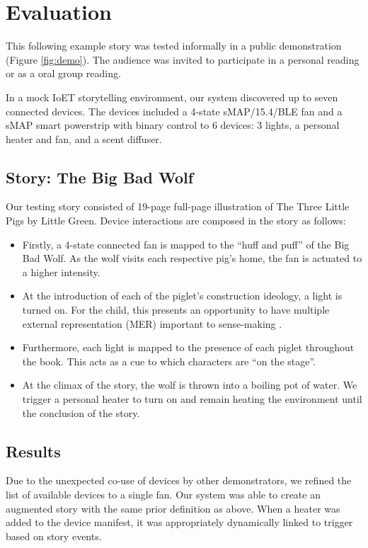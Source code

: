 \documentclass{sigchi}
\begin{document}
\section{Evaluation}
This following example story was tested informally in a public demonstration (Figure \ref{fig:demo}). The audience was invited to participate in a personal reading or as a oral group reading.

In a mock IoET storytelling environment, our system discovered up to seven connected devices. The devices included a 4-state sMAP/15.4/BLE fan and a sMAP smart powerstrip with binary control to 6 devices: 3 lights, a personal heater and fan, and a scent diffuser.  

\subsection{Story: The Big Bad Wolf}
Our testing story consisted of 19-page full-page illustration of The Three Little Pigs by Little Green. Device interactions are composed in the story as follows:
\begin{itemize}
\item Firstly, a 4-state connected fan is mapped to the ``huff and puff'' of the Big Bad Wolf. As the wolf visits each respective pig's home, the fan is actuated to a higher intensity. 
\item At the introduction of each of the piglet's construction ideology, a light is turned on. For the child, this presents an opportunity to have multiple external representation (MER) important to sense-making \cite{ainsworth_deft:_2006}. 
\item Furthermore, each light is mapped to the presence of each piglet throughout the book. This acts as a cue to which characters are ``on the stage''. 
\item At the climax of the story, the wolf is thrown into a boiling pot of water. We trigger a personal heater to turn on and remain heating the environment until the conclusion of the story. 
\end{itemize}

\subsection{Results}
Due to the unexpected co-use of devices by other demonstrators, we refined the list of available devices to a single fan. Our system was able to create an augmented story with the same prior definition as above. When a heater was added to the device manifest, it was appropriately dynamically linked to trigger based on story events. 
\end{document}
